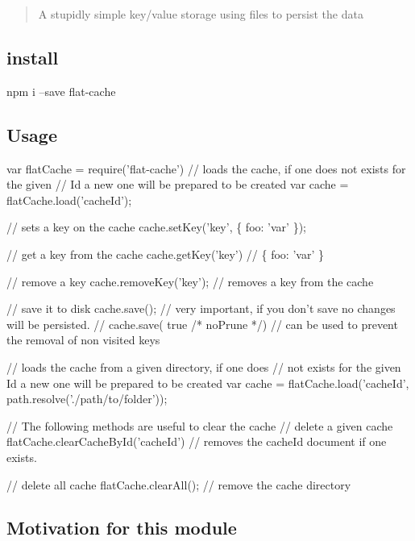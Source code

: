 \begin{quote}
A stupidly simple key/value storage using files to persist the data \end{quote}


\href{https://npmjs.org/package/flat-cache}{\tt } \href{https://travis-ci.org/royriojas/flat-cache}{\tt }

\subsection*{install}


\begin{DoxyCode}
npm i --save flat-cache
\end{DoxyCode}


\subsection*{Usage}


\begin{DoxyCode}
var flatCache = require('flat-cache')
// loads the cache, if one does not exists for the given
// Id a new one will be prepared to be created
var cache = flatCache.load('cacheId');

// sets a key on the cache
cache.setKey('key', \{ foo: 'var' \});

// get a key from the cache
cache.getKey('key') // \{ foo: 'var' \}

// remove a key
cache.removeKey('key'); // removes a key from the cache

// save it to disk
cache.save(); // very important, if you don't save no changes will be persisted.
// cache.save( true /* noPrune */) // can be used to prevent the removal of non visited keys

// loads the cache from a given directory, if one does
// not exists for the given Id a new one will be prepared to be created
var cache = flatCache.load('cacheId', path.resolve('./path/to/folder'));

// The following methods are useful to clear the cache
// delete a given cache
flatCache.clearCacheById('cacheId') // removes the cacheId document if one exists.

// delete all cache
flatCache.clearAll(); // remove the cache directory
\end{DoxyCode}


\subsection*{Motivation for this module}

